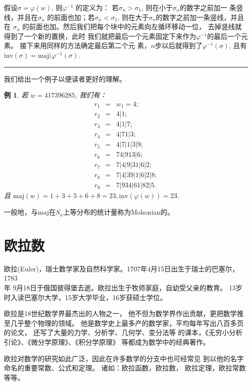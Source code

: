 \documentclass[a4paper,11pt,twoside]{book}
\newtheorem{exa}[thm]{例}
\def\qed{\nopagebreak\hfill{\rule{4pt}{7pt}}\medbreak}
\def \sg{\sigma}
\def \maj{\mathrm{maj}}
\def \inv{\mathrm{inv}}
\begin{document}
假设$\sigma=\varphi(w)$, 则$\varphi^{-1}$ 的定义为：
若$\sg_n>\sg_1$, 则在小于$\sg_n$的数字之前加一 条竖线，并且在$\sg_n$
的前面也加；若$\sg_n<\sg_1$,
则在大于$\sg_n$的数字之前加一条竖线，并且在 $\sg_n$
的前面也加。然后我们把每个块中的元素向左循环移动一位，
去掉竖线就得到了一个新的置换，此时
我们就把最后一个元素固定下来作为$\varphi^{-1}$的最后一个元素。
接下来用同样的方法确定最后第二个元
素，$n$步以后就得到了$\varphi^{-1}(\sg)$,
且有$\inv(\sg)=\maj(\varphi^{-1}(\sg)$. \qed


我们给出一个例子以便读者更好的理解。

\begin{exa}
若 $w=417396285$, 我们有：
\begin{eqnarray*}
r_1  &=& w_1=4;\\
r_2  &=& 4|1;\\
r_3  &=& 4|1|7;\\
r_4  &=& 4|71|3;\\
r_5  &=& 4|7|1|3|9;\\
r_6  &=& 74|913|6;\\
r_7  &=& 7|4|9|31|6|2;\\
r_8  &=& 7|4|39|1|6|2|8;\\
r_9  &=& 7|934|61|82|5.
\end{eqnarray*}
且 $\maj(w)=1+3+5+6+8=23, \inv(\varphi(w))=23$.
\end{exa}

一般地，与$\mathrm{maj}$在$S_n$上等分布的统计量称为Mohonian的。




\section{欧拉数}

欧拉(Euler)，瑞士数学家及自然科学家。1707年4月15日出生于瑞士的巴塞尔，1783\\年
9月18日于俄国彼得堡去逝。欧拉出生于牧师家庭，自幼受父亲的教育。
13岁时入读巴塞尔大学，15岁大学毕业，16岁获硕士学位。

欧拉是18世纪数学界最杰出的人物之一，
他不但为数学界作出贡献，更把数学推至几乎整个物理的领域。
他是数学史上最多产的数学家，平均每年写出八百多页的论文，
还写了大量的力学、分析学、几何学、变分法等
的课本，《无穷小分析引论》、《微分学原理》、《积分学原理》
等都成为数学中的经典著作。

欧拉对数学的研究如此广泛，因此在许多数学的分支中也可经常见
到以他的名字
命名的重要常数、公式和定理。 诸如：欧拉函数，欧拉数，
欧拉定理，欧拉常数等等。
\end{document}
